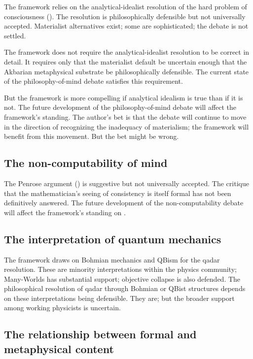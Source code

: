 The framework relies on the analytical-idealist resolution of the
hard problem of consciousness (). The
resolution is philosophically defensible but not universally
accepted. Materialist alternatives exist; some are sophisticated;
the debate is not settled.

The framework does not require the analytical-idealist resolution
to be correct in detail. It requires only that the materialist
default be uncertain enough that the Akbarian metaphysical
substrate be philosophically defensible. The current state of the
philosophy-of-mind debate satisfies this requirement.

But the framework is more compelling if analytical idealism is
true than if it is not. The future development of the
philosophy-of-mind debate will affect the framework's standing.
The author's bet is that the debate will continue to move in the
direction of recognizing the inadequacy of materialism; the
framework will benefit from this movement. But the bet might be
wrong.

\subsection{The non-computability of mind}

The Penrose argument () is suggestive
but not universally accepted. The critique that the
mathematician's seeing of consistency is itself formal has not
been definitively answered. The future development of the
non-computability debate will affect the framework's standing on
.

\subsection{The interpretation of quantum mechanics}

The framework draws on Bohmian mechanics and QBism for the qadar
resolution. These are minority interpretations within the
physics community; Many-Worlds has substantial support; objective
collapse is also defended. The philosophical resolution of qadar
through Bohmian or QBist structures depends on these
interpretations being defensible. They are; but the broader
support among working physicists is uncertain.

\subsection{The relationship between formal and metaphysical content}


